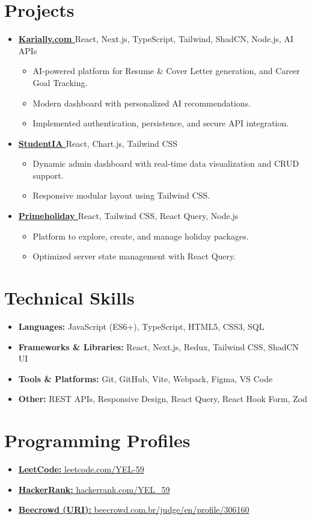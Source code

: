 \documentclass[a4paper,10.5pt]{article}
\newcommand{\resumeItem}[1]{\item\small{#1}}
\newcommand{\resumeSubHeadingListStart}{\begin{itemize}[leftmargin=*,itemsep=2pt]}
\newcommand{\resumeSubHeadingListEnd}{\end{itemize}}
\newcommand{\resumeItemListStart}{\begin{itemize}[leftmargin=*,itemsep=1pt]}
\newcommand{\resumeItemListEnd}{\end{itemize}}
\newcommand{\resumeProjectHeading}[2]{\item \textbf{#1} \hfill {#2}}
\begin{document}
\section{Projects}
\resumeSubHeadingListStart

\resumeProjectHeading
    {\href{https://karially.com}{Karially.com \faExternalLink}}{React, Next.js, TypeScript, Tailwind, ShadCN, Node.js, AI APIs}
    \resumeItemListStart
      \resumeItem{AI-powered platform for Resume \& Cover Letter generation, and Career Goal Tracking.}
      \resumeItem{Modern dashboard with personalized AI recommendations.}
      \resumeItem{Implemented authentication, persistence, and secure API integration.}
    \resumeItemListEnd

\resumeProjectHeading
    {\href{https://studentia.vercel.app}{StudentIA \faExternalLink}}{React, Chart.js, Tailwind CSS}
    \resumeItemListStart
      \resumeItem{Dynamic admin dashboard with real-time data visualization and CRUD support.}
      \resumeItem{Responsive modular layout using Tailwind CSS.}
    \resumeItemListEnd

\resumeProjectHeading
    {\href{https://primeholiday.vercel.app}{Primeholiday \faExternalLink}}{React, Tailwind CSS, React Query, Node.js}
    \resumeItemListStart
      \resumeItem{Platform to explore, create, and manage holiday packages.}
      \resumeItem{Optimized server state management with React Query.}
    \resumeItemListEnd

\resumeSubHeadingListEnd

\section{Technical Skills}
\resumeSubHeadingListStart
  \item{\textbf{Languages:} JavaScript (ES6+), TypeScript, HTML5, CSS3, SQL}
  \item{\textbf{Frameworks \& Libraries:} React, Next.js, Redux, Tailwind CSS, ShadCN UI}
  \item{\textbf{Tools \& Platforms:} Git, GitHub, Vite, Webpack, Figma, VS Code}
  \item{\textbf{Other:} REST APIs, Responsive Design, React Query, React Hook Form, Zod}
\resumeSubHeadingListEnd

\section{Programming Profiles}
\resumeSubHeadingListStart
  \item{\href{https://leetcode.com/YEL-59/}{\textbf{LeetCode:} leetcode.com/YEL-59}}
  \item{\href{https://www.hackerrank.com/YEL_59?hr_r=1}{\textbf{HackerRank:} hackerrank.com/YEL\_59}}
  \item{\href{https://www.beecrowd.com.br/judge/en/profile/306160}{\textbf{Beecrowd (URI):} beecrowd.com.br/judge/en/profile/306160}}
\resumeSubHeadingListEnd
\end{document}

